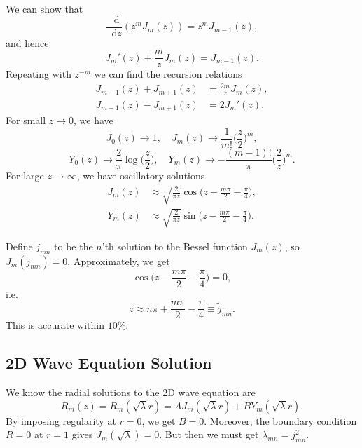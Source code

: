 \documentclass[12pt]{article}
\newcommand{\diff}{\mathop{}\!\mathrm{d}}
\theoremstyle{definition}
\theoremstyle{remark}
\begin{document}
We can show that
\[
	\frac{\diff}{\diff z} (z^{m} J_m(z)) = z^{m}J_{m-1}(z)
,\]
and hence
\[
	J_m'(z) + \frac{m}{z}J_m(z) = J_{m-1}(z)
.\]
Repeating with $z^{-m}$ we can find the recursion relations
\begin{align*}
	J_{m-1}(z) + J_{m+1}(z) &= \frac{2m}{z} J_m(z), \\
	J_{m-1}(z) - J_{m+1}(z) &= 2 J_m'(z).
\end{align*}
For small $z \to 0$, we have
\[
	J_0(z) \to 1, \quad J_m(z) \to \frac{1}{m!} \biggl( \frac{z}{2} \biggr)^{m}
,\]
\[
	Y_0(z) \to \frac{2}{\pi} \log \biggl( \frac{z}{2} \biggr), \quad Y_m(z) \to - \frac{(m-1)!}{\pi} \biggl( \frac{2}{z} \biggr)^{m}
.\]
For large $z \to \infty$, we have oscillatory solutions
\begin{align*}
	J_m(z) &\approx \sqrt{\frac{2}{\pi z}} \cos \biggl( z - \frac{m \pi}{2} - \frac{\pi}{4} \biggr), \\
	Y_m(z) &\approx \sqrt{\frac{2}{\pi z}} \sin \biggl( z - \frac{m \pi}{2} - \frac{\pi}{4} \biggr).
\end{align*}

Define $j_{mn}$ to be the $n$'th solution to the Bessel function $J_m(z)$, so $J_m(j_{mn}) = 0$. Approximately, we get
\[
	\cos \biggl( z - \frac{m \pi}{2} - \frac{\pi}{4} \biggr) = 0
,\]
i.e.
\[
z \approx n \pi + \frac{m \pi}{2} - \frac{\pi}{4} \equiv \tilde j_{mn}
.\]
This is accurate within $10\%$.

\subsection{2D Wave Equation Solution}%
\label{sub:2d_wave_equation_solution}

We know the radial solutions to the 2D wave equation are
\[
	R_m(z) = R_m(\sqrt \lambda r) = A J_m(\sqrt \lambda r) + B Y_m(\sqrt \lambda r)
.\]
By imposing regularity at $r = 0$, we get $B = 0$. Moreover, the boundary condition $R = 0$ at $r = 1$ gives $J_m(\sqrt \lambda) = 0$. But then we must get $\lambda_{mn} = j_{mn}^{2}$.
\end{document}
